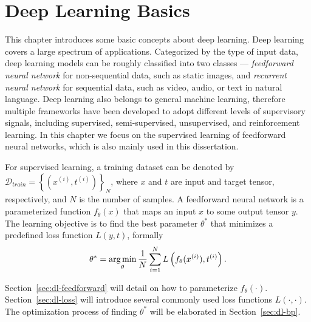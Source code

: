 \chapter{Deep Learning Basics}
\label{ch:deep-learning-basics}

This chapter introduces some basic concepts about deep learning. Deep learning covers a large spectrum of applications. Categorized by the type of input data, deep learning models can be roughly classified into two classes --- \emph{feedforward neural network} for non-sequential data, such as static images, and \emph{recurrent neural network} for sequential data, such as video, audio, or text in natural language. Deep learning also belongs to general machine learning, therefore multiple frameworks have been developed to adopt different levels of supervisory signals, including supervised, semi-supervised, unsupervised, and reinforcement learning. In this chapter we focus on the supervised learning of feedforward neural networks, which is also mainly used in this dissertation.

For supervised learning, a training dataset can be denoted by $\mathcal{D}_{train}=\left\{(x^{(i)}, t^{(i)})\right\}_N$, where $x$ and $t$ are input and target tensor, respectively, and $N$ is the number of samples. A feedforward neural network is a parameterized function $f_\theta(x)$ that maps an input $x$ to some output tensor $y$. The learning objective is to find the best parameter $\theta^*$ that minimizes a predefined loss function $L(y,t)$, formally
\begin{equation} \label{eq:objfunc}
  \theta^* = \mathop{\mathrm{arg\,min}}_\theta \frac{1}{N} \sum_{i=1}^N L\left(f_\theta(x^{(i)}), t^{(i)}\right).
\end{equation}

Section~\ref{sec:dl-feedforward} will detail on how to parameterize $f_\theta(\cdot)$. Section~\ref{sec:dl-loss} will introduce several commonly used loss functions $L(\cdot,\cdot)$. The optimization process of finding $\theta^*$ will be elaborated in Section~\ref{sec:dl-bp}.





